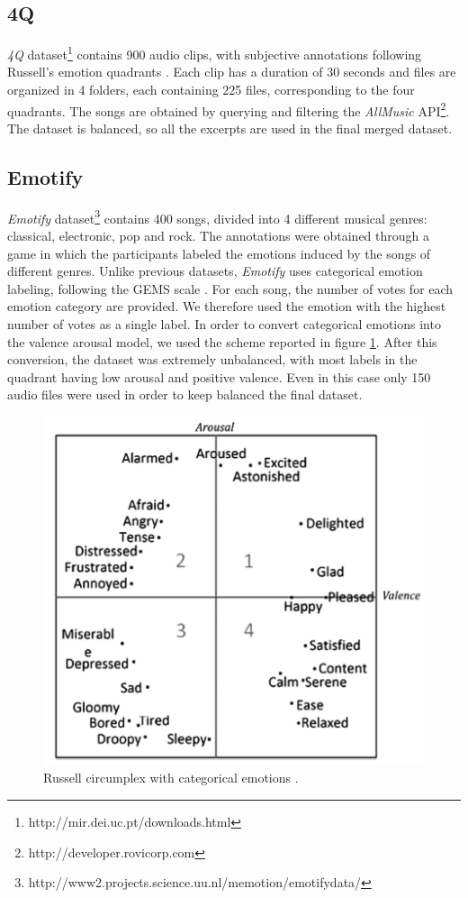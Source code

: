 \documentclass[runningheads]{llncs}
\begin{document}
\subsection{4Q}
\textit{4Q} dataset\footnote{http://mir.dei.uc.pt/downloads.html} contains 900 audio clips, with subjective annotations following Russell's emotion quadrants \cite{panda2018musical}\cite{panda2018novel}. Each clip has a duration of 30 seconds and files are organized in 4 folders, each containing 225 files, corresponding to the four quadrants. The songs are obtained by querying and filtering the \textit{AllMusic} API\footnote{http://developer.rovicorp.com}. The dataset is balanced, so all the excerpts are used in the final merged dataset.



\subsection{Emotify}

\textit{Emotify} dataset\footnote{http://www2.projects.science.uu.nl/memotion/emotifydata/} contains 400 songs, divided into 4 different musical genres: classical, electronic, pop and rock. The annotations were obtained through a game in which the participants labeled the emotions induced by the songs of different genres. Unlike previous datasets, \textit{Emotify} uses categorical emotion labeling, following the GEMS scale \cite{zentner2008emotions}. For each song, the number of votes for each emotion category are provided. We therefore used the emotion with the highest number of votes as a single label. In order to convert categorical emotions into the valence arousal model, we used the scheme reported in figure \ref{fig-emotify}. After this conversion, the dataset was extremely unbalanced, with most labels in the quadrant having low arousal and positive valence. Even in this case only 150 audio files were used in order to keep balanced the final dataset.

\begin{figure}
\centering
\includegraphics[scale = 0.48]{img/categorical-to-russell.PNG}
\caption{Russell circumplex with categorical emotions \cite{panda2018novel}.}
\label{fig-emotify}
\end{figure}
\end{document}
